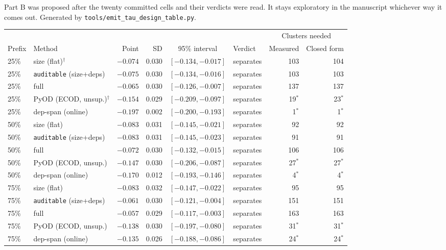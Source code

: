 \begin{table}[t]
{Part B was proposed after the twenty committed cells and their verdicts were read. It stays exploratory in the manuscript whichever way it comes out.
Generated by \texttt{tools/emit\_tau\_design\_table.py}.}
\label{tab:tau-design}
\begin{tabular}{@{}llrrclrr@{}}
\toprule
& & & & & & \multicolumn{2}{c}{Clusters needed} \\
\cmidrule(l){7-8}
Prefix & Method & Point & SD & 95\% interval & Verdict & Measured & Closed form \\
\midrule
25\% & size (flat)$^{\dagger}$ & $-0.074$ & 0.030 & $[-0.134, -0.017]$ & separates & 103 & 104 \\
25\% & \texttt{auditable} (size+deps) & $-0.075$ & 0.030 & $[-0.134, -0.016]$ & separates & 103 & 103 \\
25\% & full & $-0.065$ & 0.030 & $[-0.126, -0.007]$ & separates & 137 & 137 \\
25\% & PyOD (ECOD, unsup.)$^{\dagger}$ & $-0.154$ & 0.029 & $[-0.209, -0.097]$ & separates & 19$^{\ast}$ & 23$^{\ast}$ \\
25\% & dep-span (online) & $-0.197$ & 0.002 & $[-0.200, -0.193]$ & separates & 1$^{\ast}$ & 1$^{\ast}$ \\
\midrule
50\% & size (flat) & $-0.083$ & 0.031 & $[-0.145, -0.021]$ & separates & 92 & 92 \\
50\% & \texttt{auditable} (size+deps) & $-0.083$ & 0.031 & $[-0.145, -0.023]$ & separates & 91 & 91 \\
50\% & full & $-0.072$ & 0.030 & $[-0.132, -0.015]$ & separates & 106 & 106 \\
50\% & PyOD (ECOD, unsup.) & $-0.147$ & 0.030 & $[-0.206, -0.087]$ & separates & 27$^{\ast}$ & 27$^{\ast}$ \\
50\% & dep-span (online) & $-0.170$ & 0.012 & $[-0.193, -0.146]$ & separates & 4$^{\ast}$ & 4$^{\ast}$ \\
\midrule
75\% & size (flat) & $-0.083$ & 0.032 & $[-0.147, -0.022]$ & separates & 95 & 95 \\
75\% & \texttt{auditable} (size+deps) & $-0.061$ & 0.030 & $[-0.121, -0.004]$ & separates & 151 & 151 \\
75\% & full & $-0.057$ & 0.029 & $[-0.117, -0.003]$ & separates & 163 & 163 \\
75\% & PyOD (ECOD, unsup.) & $-0.138$ & 0.030 & $[-0.197, -0.080]$ & separates & 31$^{\ast}$ & 31$^{\ast}$ \\
75\% & dep-span (online) & $-0.135$ & 0.026 & $[-0.188, -0.086]$ & separates & 24$^{\ast}$ & 24$^{\ast}$ \\

\end{tabular}
\end{table}
